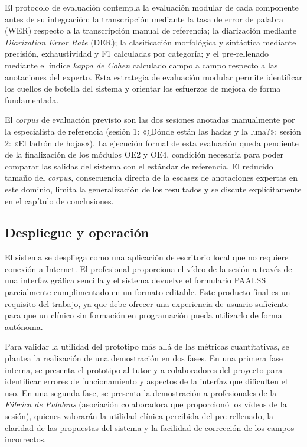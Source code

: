 El protocolo de evaluación contempla la
evaluación modular de cada componente antes de su integración: la transcripción mediante
la tasa de error de palabra (\ac{WER}) respecto a la transcripción manual de referencia;
la diarización mediante \emph{Diarization Error Rate} (\ac{DER}); la clasificación
morfológica y sintáctica mediante precisión, exhaustividad y F1 calculadas por
categoría; y el pre-rellenado mediante el índice \emph{kappa de Cohen} calculado campo
a campo respecto a las anotaciones del experto. Esta estrategia de evaluación modular
permite identificar los cuellos de botella del sistema y orientar los esfuerzos de
mejora de forma fundamentada.

El \emph{corpus} de evaluación previsto son las dos sesiones anotadas manualmente por
la especialista de referencia (sesión 1: «¿Dónde están las hadas y la luna?»; sesión
2: «El ladrón de hojas»). La ejecución formal de esta evaluación queda pendiente de la
finalización de los módulos OE2 y OE4, condición necesaria para poder comparar las
salidas del sistema con el estándar de referencia. El reducido tamaño del
\emph{corpus}, consecuencia directa de la escasez de anotaciones expertas en este
dominio, limita la generalización de los resultados y se discute explícitamente en el
capítulo de conclusiones.


\subsection{Despliegue y operación}
\label{subsec:despliegue}

El sistema se despliega como una aplicación de escritorio local que no requiere
conexión a Internet. El profesional proporciona el vídeo de la sesión a través de una 
interfaz gráfica sencilla y el sistema devuelve el formulario \ac{PAALSS} parcialmente 
cumplimentado en un formato editable. Este producto final es
un requisito del trabajo, ya que debe ofrecer una experiencia de usuario
suficiente para que un clínico sin formación en programación pueda utilizarlo de forma
autónoma.

Para validar la utilidad del prototipo más allá de las métricas cuantitativas, se
plantea la realización de una demostración en dos fases. En una primera fase interna,
se presenta el prototipo al tutor y a colaboradores del proyecto para identificar
errores de funcionamiento y aspectos de la interfaz que dificulten el uso. En una
segunda fase, se presenta la demostración a profesionales de la \emph{Fábrica de
Palabras} (asociación colaboradora que proporcionó los vídeos de la sesión), quienes
valorarán la utilidad clínica percibida del pre-rellenado, la claridad de las
propuestas del sistema y la facilidad de corrección de los campos incorrectos.


